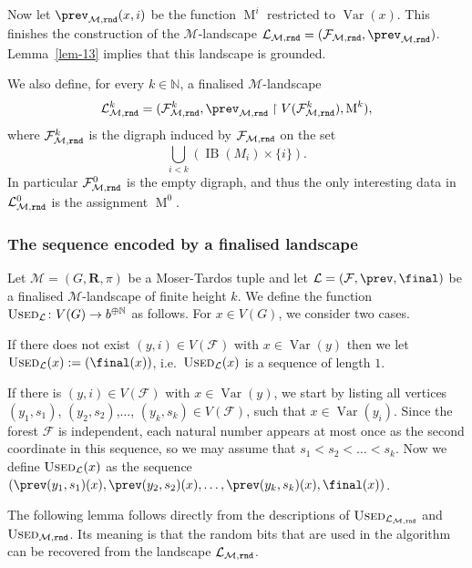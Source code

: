 \documentclass[12pt,a4paper]{article}
\numberwithin{equation}{section}
\theoremstyle{definition}
\newcommand\NN{\mathbb N}
\renewcommand{\cal}[1]{{\mathcal #1}}
\newcommand\MT{\operatorname{M}}
\newcommand\IB{\operatorname{IB}}
\newcommand\Var{\operatorname{Var}}
\newcommand{\used}{\textsc{Used}}
\begin{document}
    Now  let $\prev_{\cal M,\rnd}(x,i)$ be the function $\MT^i$ restricted to $\Var(x)$. This finishes the construction of the $\cal M$-landscape $\cal L_{\cal M,\rnd} = (\cal F_{\cal M,\rnd}, \prev_{\cal M,\rnd})$. Lemma~\ref{lem-13} implies that this landscape is grounded.
    
    We also define, for every $k\in \NN$, a finalised $\cal M$-landscape  
    \begin{equation}\label{eq-fin-landscape}
        \cal L^k_{\cal M,\rnd} =(\cal F^k_{\cal M,\rnd},\prev_{\cal M, \rnd}\restriction V(\cal F^k_{\cal M,\rnd}), \MT^k),
    \end{equation}
    where $\cal F^k_{\cal M,\rnd}$ is the digraph induced by $\cal F_{\cal M,\rnd}$ on the set 
    $$
        \bigcup_{i < k} \left(\IB(M_i)\times\{i\}\right).
    $$
    In particular $\cal F^0_{\cal M,\rnd}$ is the empty digraph, and thus the only interesting data in $\cal L^0_{\cal M, \rnd}$ is the assignment $\MT^0$. 
    
    \subsubsection{The sequence encoded by a finalised landscape}
    
    Let  $\cal M=(G, \mathbf R,\pi)$ be a Moser-Tardos tuple and let $\cal L =(\cal F,\prev, \final)$ be a finalised $\cal M$-landscape of finite height $k$. We  define the function $\used_{\cal L}\colon V(G)\to b^{\oplus \NN}$ as follows. For $x\in V(G)$, we consider two cases. 
    
    If there does not exist $(y,i)\in V(\cal F)$ with $x\in \Var(y)$ then we let $\used_{\cal L}(x) := (\final(x))$, i.e.~$\used_{\cal L}(x)$ is a sequence of length $1$.  
    
    If there is $ (y,i)\in V(\cal F)$ with $x\in \Var(y)$, we start by listing all vertices $(y_1,s_1)$, $(y_2,s_2)$,$\ldots$, $(y_k,s_k)\in V(\cal F)$, such that $x\in \Var(y_i)$. Since the forest $\cal F$ is independent, each natural number appears at most once as the second coordinate in this sequence, so we may assume that $s_1<s_2<\ldots<s_k$. Now we define $\used_{\cal L}(x)$ as the sequence $(\prev(y_1,s_1)(x), \prev(y_2,s_2)(x),\ldots, \prev(y_k,s_k)(x), \final(x))$. 
    
    The following lemma follows directly from the descriptions of $\used_{\cal L_{\cal M,\rnd}}$ and $\used_{\cal M,\rnd}$. Its meaning is that the random bits that are used in the algorithm can be recovered from the landscape $\cal L_{\cal M,\rnd}$.
    
\end{document}

